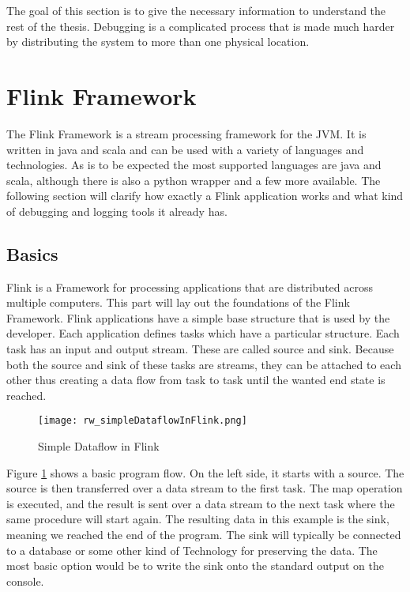 The goal of this section is to give the necessary information to understand the rest of the thesis. Debugging is a complicated process that is made much harder by distributing the system to more than one physical location.

\section{Flink Framework}
\label{flinkFramework}
The Flink Framework is a stream processing framework for the JVM. It is written in java and scala and can be used with a variety of languages and technologies. As is to be expected the most supported languages are java and scala, although there is also a python wrapper and a few more available. The following section will clarify how exactly a Flink application works and what kind of debugging and logging tools it already has.

\subsection{Basics}
Flink is a Framework for processing applications that are distributed across multiple computers. This part will lay out the foundations of the Flink Framework.
Flink applications have a simple base structure that is used by the developer. Each application defines tasks which have a particular structure. Each task has an input and output stream. These are called source and sink. Because both the source and sink of these tasks are streams, they can be attached to each other thus creating a data flow from task to task until the wanted end state is reached.

\begin{figure}[h]
    \centering
      \texttt{[image: rw\_simpleDataflowInFlink.png]}
      \caption{Simple Dataflow in Flink}
      \label{simpleDataflowInFlink}
\end{figure}

Figure \ref{simpleDataflowInFlink} shows a basic program flow. On the left side, it starts with a source. The source is then transferred over a data stream to the first task. The map operation is executed, and the result is sent over a data stream to the next task where the same procedure will start again. The resulting data in this example is the sink, meaning we reached the end of the program. The sink will typically be connected to a database or some other kind of Technology for preserving the data. The most basic option would be to write the sink onto the standard output on the console.

